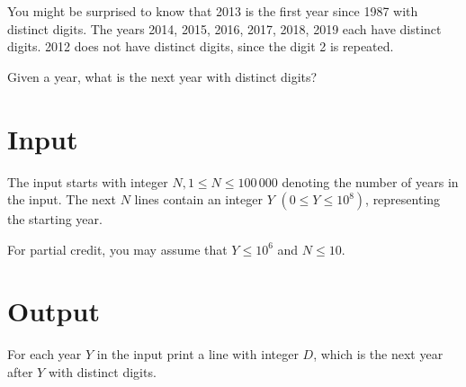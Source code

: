 You might be surprised to know that 2013 is the first year since 1987 with distinct digits. The
years 2014, 2015, 2016, 2017, 2018, 2019 each have distinct digits. 2012 does not have distinct
digits, since the digit 2 is repeated.

Given a year, what is the next year with distinct digits?

\section*{Input}
The input starts with integer $N, 1\le N \le 100\,000$ denoting the number of years in the input.
The next $N$ lines contain an integer $Y$ $(0 \le Y \le 10^8)$, representing the starting year.

For partial credit, you may assume that $Y\le 10^6$ and $N\le 10$.

\section*{Output}
For each year $Y$ in the input print a line with integer $D$, which is the next year after $Y$ with
distinct digits.
